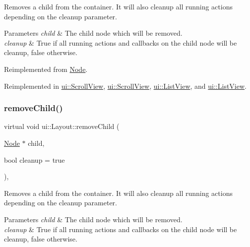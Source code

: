 Removes a child from the container. It will also cleanup all running actions depending on the cleanup parameter.


\begin{DoxyParams}{Parameters}
{\em child} & The child node which will be removed. \\
\hline
{\em cleanup} & True if all running actions and callbacks on the child node will be cleanup, false otherwise. \\
\hline
\end{DoxyParams}


Reimplemented from \hyperlink{classNode_a872d4a7d389b26b0c6ad7ed99c8b1b65}{Node}.



Reimplemented in \hyperlink{classui_1_1ScrollView_ae3b50790cd7fa0feeacc9204fe86fc1a}{ui\+::\+Scroll\+View}, \hyperlink{classui_1_1ScrollView_a678108e716966e8beccc25c0de1d9b29}{ui\+::\+Scroll\+View}, \hyperlink{classui_1_1ListView_ace4890246e03a8de66cfe9d0312df365}{ui\+::\+List\+View}, and \hyperlink{classui_1_1ListView_a7002fe4ad783aeccf56cebbe4144036e}{ui\+::\+List\+View}.

\mbox{\label{classui_1_1Layout_a3a391ace9855a825523cdc882c271abe}} 
\subsubsection{\texorpdfstring{remove\+Child()}{removeChild()}\hspace{0.1cm}{\footnotesize\ttfamily [2/2]}}
{\footnotesize\ttfamily virtual void ui\+::\+Layout\+::remove\+Child (\begin{DoxyParamCaption}\item[{\hyperlink{classNode}{Node} $\ast$}]{child,  }\item[{bool}]{cleanup = {\ttfamily true} }\end{DoxyParamCaption})\hspace{0.3cm}{\ttfamily [override]}, {\ttfamily [virtual]}}

Removes a child from the container. It will also cleanup all running actions depending on the cleanup parameter.


\begin{DoxyParams}{Parameters}
{\em child} & The child node which will be removed. \\
\hline
{\em cleanup} & True if all running actions and callbacks on the child node will be cleanup, false otherwise. \\
\hline
\end{DoxyParams}


